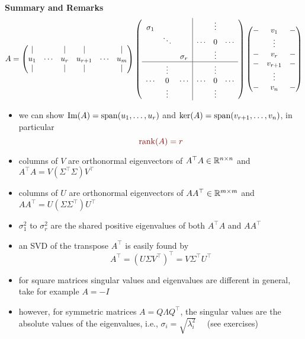 \begin{frame}
	~\\
{\bf Summary and Remarks} \small
$$
		A = \begin{pmatrix}
		|&&|&|&&|\\
		u_1&\cdots&u_r&u_{r+1}&\cdots&u_m\\
		|&&|&|&&|
		\end{pmatrix} 	\left(\begin{array}{ccc|ccc}
		\sigma_1&&&&\vdots&\\
		&\ddots&&\cdots&0&\cdots\\
		&&\sigma_r&&\vdots&\\\hline
		&\vdots&&&\vdots&\\
		\cdots&0&\cdots&\cdots&0&\cdots\\
		&\vdots&&&\vdots&
		\end{array}\right)  \begin{pmatrix}
		-&v_1&-\\
		~&\vdots&~\\
		-&v_r&-\\
		-&v_{r+1}&-\\
		~&\vdots&~\\
		-&v_n&-
		\end{pmatrix}
$$
\begin{itemize}
\item we can show $\operatorname{Im}(A)  =  \operatorname{span}(u_1,\ldots, u_r)$ and $\ker(A) = \operatorname{span}(v_{r+1},\ldots, v_n)$, in particular
$$ {\color{satzrot}\rank(A) = r}$$
\item columns of $V$ are orthonormal eigenvectors of $A^\top A \in {\mathbb{R}}^{n\times n}$ and
$A^\top A = V (\Sigma^\top \Sigma )V^\top $
\item columns of $U$ are orthonormal eigenvectors of $AA^\top  \in {\mathbb{R}}^{m\times m}$
and
$AA^\top  = U (\Sigma \Sigma^\top ) U^\top $
\item $\sigma_1^2$ to $\sigma_r^2$ are the shared positive eigenvalues of both $A^\top A$ and $AA^\top $
\item an SVD of the transpose $A^\top$ is easily found by
 $$A^\top = (U \Sigma V^\top)^\top = V \Sigma^\top U^\top $$
\item for square matrices singular values and eigenvalues are different in general, take for example $A = -I$
\item however, for symmetric matrices $A=Q \Lambda Q^\top$, the singular values are the absolute values of the eigenvalues, i.e., $\sigma_i=\sqrt{\lambda_i^2}$ ~~(see exercises)
\end{itemize}
\end{frame}

